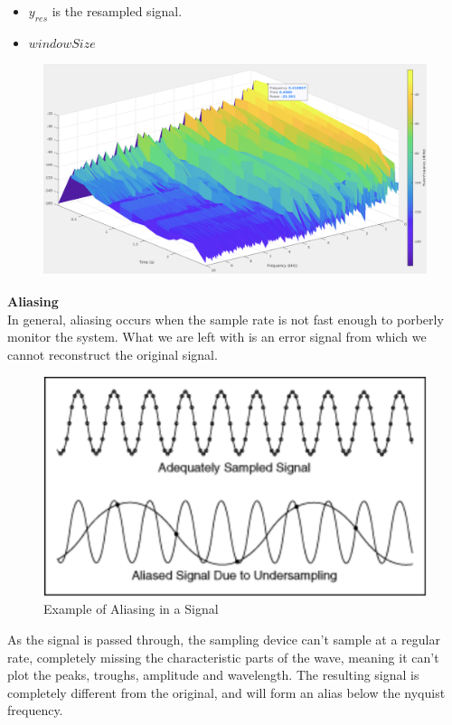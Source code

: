 \documentclass[12pt,a4paper]{article}
\begin{document}
	\begin{itemize}
		\item $y_{res}$ is the resampled signal.
		\item $windowSize$ 
	\end{itemize}
	\begin{figure}[H]
		\begin{center}
			\includegraphics[width=0.9\linewidth]{Spectograph}
		\end{center}
	\end{figure}
\newpage
	\textbf{Aliasing}\\
	In general, aliasing occurs when the sample rate is not fast enough to porberly monitor the system. What we are left with is an error signal from which we cannot reconstruct the original signal.\\
	\begin{figure}[H]
		\begin{center}
			\includegraphics[width=0.7\linewidth]{Aliasing}
		\end{center}
		\caption{Example of Aliasing in a Signal}
	\end{figure}
	As the signal is passed through, the sampling device can’t sample at a regular rate, completely missing the characteristic parts of the wave, meaning it can’t plot the peaks, troughs, amplitude and wavelength.
The resulting signal is completely different from the original, and will form an alias below the nyquist frequency.
\end{document}

